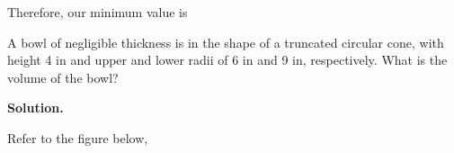 \documentclass[12pt,paper=letter]{scrartcl}
\newcommand{\sol}{{\sffamily \bfseries Solution.}\;}
\begin{document}
Therefore, our minimum value is 

\begin{probboxed}
A bowl of negligible thickness is in the shape of a truncated circular cone, with height 4 in and upper and lower radii of 6 in and 9 in, respectively. What is the volume of the bowl?
\end{probboxed}

\sol

Refer to the figure below,

\begin{center}
 



\begin{tikzpicture}[x=0.75pt,y=0.75pt,yscale=-1,xscale=1]


\end{tikzpicture}
\end{center}
\end{document}

